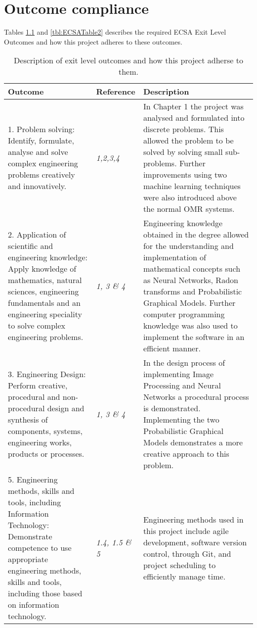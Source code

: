 \chapter{Outcome compliance}
\label{ap:outCompliance}
\graphicspath{{Appendix2/Appendix2figures/}}
Tables \ref{tbl:ECSATable1} and \ref{tbl:ECSATable2} describes the required ECSA Exit Level Outcomes and how this project adheres to these outcomes.
\begin{table}
\caption{Description of exit level outcomes and how this project adherse to them.} \label{tbl:ECSATable1}
\begin{tabular}{|p{6cm}|p{3cm}|p{6cm}|}
\hline
\textbf{Outcome}&\textbf{Reference}&\textbf{Description}\\
\hline
1. Problem solving: Identify, formulate, analyse and solve complex engineering problems creatively and innovatively. & \textit{1,2,3,4} &In Chapter 1 the project was analysed and formulated into discrete problems. This allowed the problem to be solved by solving small sub-problems. Further improvements using two machine learning techniques were also introduced above the normal OMR systems.\\
\hline
2. Application of scientific and engineering knowledge: Apply knowledge of mathematics, natural sciences,
engineering fundamentals and an engineering speciality to solve complex engineering problems. & \textit{1, 3 \& 4} & Engineering knowledge obtained in the degree allowed for the understanding and implementation of mathematical concepts such as Neural Networks, Radon transforms and Probabilistic Graphical Models. Further computer programming knowledge was also used to implement the software in an efficient manner.\\
\hline
3. Engineering Design: Perform creative, procedural and non-procedural design and synthesis of components, systems,
engineering works, products or processes. & \textit{1, 3 \& 4} & In the design process of implementing Image Processing and Neural Networks a procedural process is demonstrated. Implementing the two Probabilistic Graphical Models demonstrates a more creative approach to this problem.\\
\hline
5. Engineering methods, skills and tools, including Information Technology: Demonstrate competence to use
appropriate engineering methods, skills and tools, including those based on information technology. &\textit{1.4, 1.5 \& 5}  & Engineering methods used in this project include agile development, software version control, through Git, and project scheduling to efficiently manage time.\\
\hline
\end{tabular}
\end{table}
